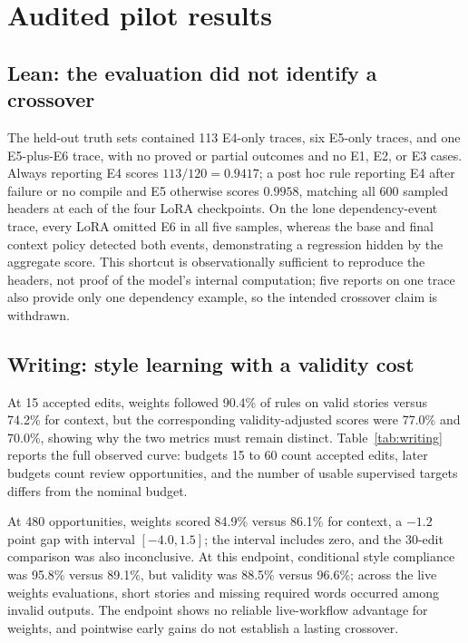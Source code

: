 \documentclass[10pt,twocolumn,letterpaper]{article}
\newcommand{\claim}[2]{#2}
\begin{document}
\section{Audited pilot results}
\subsection{Lean: the evaluation did not identify a crossover}
\claim{C28}{The held-out truth sets contained 113 E4-only traces, six E5-only traces, and one E5-plus-E6 trace, with no proved or partial outcomes and no E1, E2, or E3 cases.}
\claim{C29}{Always reporting E4 scores $113/120=0.9417$; a post hoc rule reporting E4 after failure or no compile and E5 otherwise scores $0.9958$, matching all 600 sampled headers at each of the four LoRA checkpoints.}
\claim{C30}{On the lone dependency-event trace, every LoRA omitted E6 in all five samples, whereas the base and final context policy detected both events, demonstrating a regression hidden by the aggregate score.}
\claim{C31}{This shortcut is observationally sufficient to reproduce the headers, not proof of the model's internal computation; five reports on one trace also provide only one dependency example, so the intended crossover claim is withdrawn.}

\subsection{Writing: style learning with a validity cost}
\claim{C32}{At 15 accepted edits, weights followed 90.4\% of rules on valid stories versus 74.2\% for context, but the corresponding validity-adjusted scores were 77.0\% and 70.0\%, showing why the two metrics must remain distinct.}
\claim{C33}{Table~\ref{tab:writing} reports the full observed curve: budgets 15 to 60 count accepted edits, later budgets count review opportunities, and the number of usable supervised targets differs from the nominal budget.}
\begin{table}[t]
\centering\small

\caption{\claim{T01}{Writing pilot $U S$ scores (percent) and weights-minus-context gaps (percentage points); the unadapted base scores 57.1\%. Endpoint weights average three seeds; other rows use one. These are separate evolving live pools, with early offline checkpoints.}}
\label{tab:writing}
\end{table}
\claim{C34}{At 480 opportunities, weights scored 84.9\% versus 86.1\% for context, a $-1.2$ point gap with interval $[-4.0,1.5]$; the interval includes zero, and the 30-edit comparison was also inconclusive.}
\claim{C35}{At this endpoint, conditional style compliance was 95.8\% versus 89.1\%, but validity was 88.5\% versus 96.6\%; across the live weights evaluations, short stories and missing required words occurred among invalid outputs.}
\claim{C36}{The endpoint shows no reliable live-workflow advantage for weights, and pointwise early gains do not establish a lasting crossover.}
\end{document}
